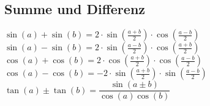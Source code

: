 \subsection{Summe und Differenz}
		$\sin(a)+\sin(b)=2 \cdot \sin \left(\frac{a+b}{2}\right) \cdot
		\cos\left(\frac{a-b}{2}\right)$\\
		$\sin(a)-\sin(b)=2 \cdot \sin \left(\frac{a-b}{2}\right) \cdot
		\cos\left(\frac{a+b}{2}\right)$\\
		$\cos(a)+\cos(b)=2 \cdot \cos \left(\frac{a+b}{2}\right) \cdot
		\cos\left(\frac{a-b}{2}\right)$\\
		$\cos(a)-\cos(b)=-2 \cdot \sin \left(\frac{a+b}{2}\right) \cdot
		\sin\left(\frac{a-b}{2}\right)$\\
		$\tan(a) \pm \tan(b)=\dfrac{\sin(a \pm b)}{\cos(a)\cos(b)}$\\